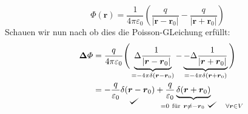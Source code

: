 \documentclass[titlepage,11pt,a4paper,ngerman]{report}
\def\checkmark{\tikz\fill[scale=0.4](0,.35) -- (.25,0) -- (1,.7) -- (.25,.15) -- cycle;}
\newcommand{\tx}[1]{\textrm{#1}}
\newcommand{\ub}[1]{\underbrace{#1}}
\newcommand{\pofr}{\Phi(\vec{r})}
\renewcommand{\Phi}{\varPhi}
\newcommand{\kq}{\frac{1}{4\pi\epsilon_0}}
\renewcommand{\vec}[1]{\boldsymbol{#1}}
\renewcommand{\epsilon}{\varepsilon}
\begin{document}
\begin{equation*}
\pofr = \kq \left( \frac{q}{|\vec{r} - \vec{r}_0|} - \frac{q}{|\vec{r}+\vec{r}_0|} \right)
\end{equation*}
Schauen wir nun nach ob dies die Poisson-GLeichung erfüllt:
\begin{align*}
\vec{\Delta} \Phi &= \frac{q}{4 \pi \epsilon_0} \Bigg( \ub{\Delta \frac{1}{|\vec{r} - \vec{r}_0|}}_{= - 4 \pi \delta(\vec{r} - \vec{r}_0)} - \ub{- \Delta \frac{1}{|\vec{r} + \vec{r}_0|}}_{= - 4 \pi \delta(\vec{r} + \vec{r}_0)}\Bigg)\\
&= \underset{\checkmark}{- \frac{q}{\epsilon_0} \delta(\vec{r} - \vec{r}_0)} + \frac{q}{\epsilon_0} \ub{\delta(\vec{r} + \vec{r}_0)}_{\mathclap{\qquad = 0 \ \tx{für} \ \vec{r} \neq - \vec{r}_0 \ \checkmark \quad \forall \vec{r} \in V}}
\end{align*}
\end{document}
